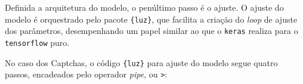 \documentclass[12pt,twoside,brazilian]{book}
\newenvironment{Shaded}{\begin{snugshade}}{\end{snugshade}}
\newcommand{\DecValTok}[1]{\textcolor[rgb]{0.68,0.00,0.00}{#1}}
\newcommand{\FunctionTok}[1]{\textcolor[rgb]{0.28,0.35,0.67}{#1}}
\newcommand{\NormalTok}[1]{\textcolor[rgb]{0.00,0.23,0.31}{#1}}
\newcommand{\SpecialCharTok}[1]{\textcolor[rgb]{0.37,0.37,0.37}{#1}}
\begin{document}
\begin{Shaded}
\end{Shaded}

Definida a arquitetura do modelo, o penúltimo passo é o ajuste. O ajuste
do modelo é orquestrado pelo pacote \texttt{\{luz\}}, que facilita a
criação do \emph{loop} de ajuste dos parâmetros, desempenhando um papel
similar ao que o \texttt{keras} realiza para o \texttt{tensorflow} puro.

No caso dos Captchas, o código \texttt{\{luz\}} para ajuste do modelo
segue quatro passos, encadeados pelo operador \emph{pipe}, ou
\texttt{\textbar{}\textgreater{}}:
\end{document}
